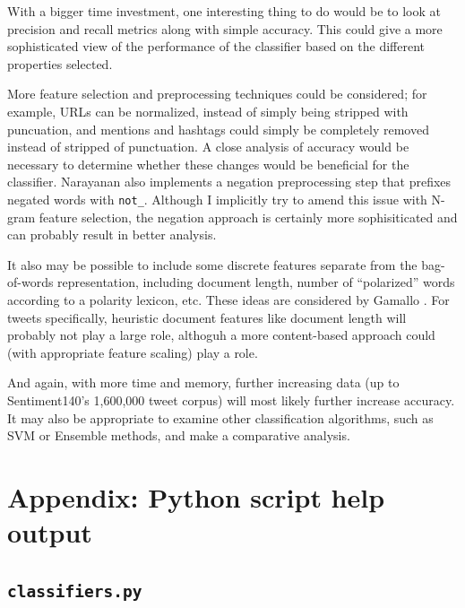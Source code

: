 \documentclass[letter,12pt]{article}
\begin{document}
With a bigger time investment, one interesting thing to do would be to look at
precision and recall metrics along with simple accuracy. This could give a more
sophisticated view of the performance of the classifier based on the different
properties selected.

More feature selection and preprocessing techniques could be considered; for
example, URLs can be normalized, instead of simply being stripped with
puncuation, and mentions and hashtags could simply be completely removed
instead of stripped of punctuation. A close analysis of accuracy would be
necessary to determine whether these changes would be beneficial for the
classifier. Narayanan \cite{narayanan13} also implements a negation
preprocessing step that prefixes negated words with \texttt{not\_}. Although I
implicitly try to amend this issue with N-gram feature selection, the negation
approach is certainly more sophisiticated and can probably result in better
analysis.

It also may be possible to include some discrete features separate from the
bag-of-words representation, including document length, number of ``polarized''
words according to a polarity lexicon, etc. These ideas are considered by
Gamallo \cite{gamallo14}. For tweets specifically, heuristic document features
like document length will probably not play a large role, althoguh a more
content-based approach could (with appropriate feature scaling) play a role.

And again, with more time and memory, further increasing data (up to
Sentiment140's 1,600,000 tweet corpus) will most likely further increase
accuracy. It may also be appropriate to examine other classification
algorithms, such as SVM or Ensemble methods, and make a comparative analysis.

\appendix
\section{Appendix: Python script help output}

\subsection{\texttt{classifiers.py}}
\label{sub:classifiers}
\end{document}
